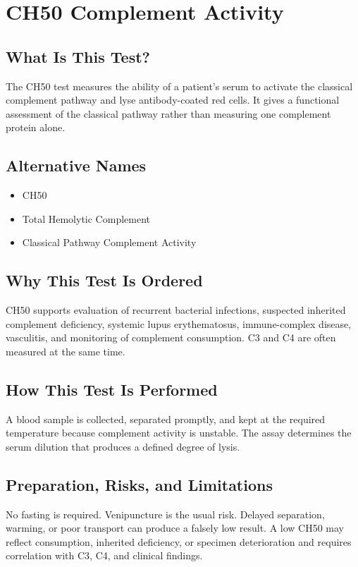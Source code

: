 \chapter{CH50 Complement Activity}

\section*{What Is This Test?}
The CH50 test measures the ability of a patient's serum to activate the classical complement pathway and lyse antibody-coated red cells. It gives a functional assessment of the classical pathway rather than measuring one complement protein alone.

\section*{Alternative Names}
\begin{itemize}
  \item CH50
  \item Total Hemolytic Complement
  \item Classical Pathway Complement Activity
\end{itemize}
\section*{Why This Test Is Ordered}
CH50 supports evaluation of recurrent bacterial infections, suspected inherited complement deficiency, systemic lupus erythematosus, immune-complex disease, vasculitis, and monitoring of complement consumption. C3 and C4 are often measured at the same time.

\section*{How This Test Is Performed}
A blood sample is collected, separated promptly, and kept at the required temperature because complement activity is unstable. The assay determines the serum dilution that produces a defined degree of lysis.

\section*{Preparation, Risks, and Limitations}
No fasting is required. Venipuncture is the usual risk. Delayed separation, warming, or poor transport can produce a falsely low result. A low CH50 may reflect consumption, inherited deficiency, or specimen deterioration and requires correlation with C3, C4, and clinical findings.

